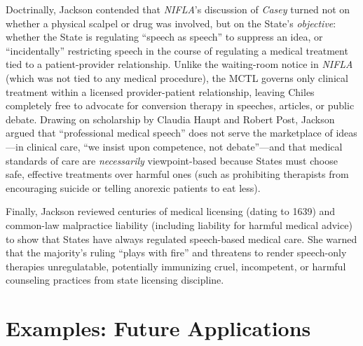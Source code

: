 \documentclass[12pt]{article}
\begin{document}
Doctrinally, Jackson contended that \textit{NIFLA}'s discussion of \textit{Casey} turned not on whether a physical scalpel or drug was involved, but on the State's \textit{objective}: whether the State is regulating ``speech as speech'' to suppress an idea, or ``incidentally'' restricting speech in the course of regulating a medical treatment tied to a patient-provider relationship. Unlike the waiting-room notice in \textit{NIFLA} (which was not tied to any medical procedure), the MCTL governs only clinical treatment within a licensed provider-patient relationship, leaving Chiles completely free to advocate for conversion therapy in speeches, articles, or public debate. Drawing on scholarship by Claudia Haupt and Robert Post, Jackson argued that ``professional medical speech'' does not serve the marketplace of ideas---in clinical care, ``we insist upon competence, not debate''---and that medical standards of care are \textit{necessarily} viewpoint-based because States must choose safe, effective treatments over harmful ones (such as prohibiting therapists from encouraging suicide or telling anorexic patients to eat less).

Finally, Jackson reviewed centuries of medical licensing (dating to 1639) and common-law malpractice liability (including liability for harmful medical advice) to show that States have always regulated speech-based medical care. She warned that the majority's ruling ``plays with fire'' and threatens to render speech-only therapies unregulatable, potentially immunizing cruel, incompetent, or harmful counseling practices from state licensing discipline.

\section{Examples: Future Applications}
\end{document}
